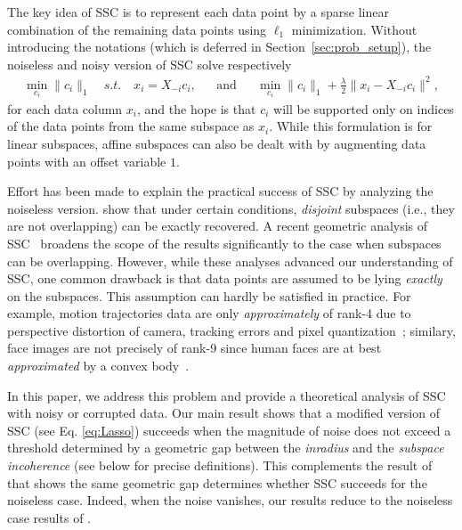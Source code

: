 \documentclass{ctexart}
\begin{document}
The key idea of SSC is to represent each data point by a sparse linear combination of the remaining data points using $\ell_1$ minimization. Without introducing the notations (which is deferred in Section~\ref{sec:prob_setup}), the noiseless and noisy version of SSC solve respectively
\begin{align*}
  \min_{c_i} \|c_i\|_1\quad s.t.\quad x_i=X_{-i}c_i, && \text{and}&& \min_{c_i} \|c_i\|_1+\frac{\lambda}{2}\|x_i-X_{-i}c_i\|^2,
\end{align*}
for each data column $x_i$, and the hope is that $c_i$ will be supported only on indices of the data points from the same subspace as $x_i$. While this formulation is for linear subspaces, affine subspaces can also be dealt with by augmenting data points with an offset variable $1$.

Effort has been made to explain the practical success of SSC by analyzing the noiseless version. \cite{elhamifar2010ssc_icassp} show that under certain conditions, \emph{disjoint} subspaces (i.e., they are not overlapping) can be exactly recovered.
A recent geometric analysis of SSC~\cite{soltanolkotabi2011geometric} broadens the scope of the results significantly to the case when subspaces can be overlapping. However, while these analyses advanced our understanding of SSC, one common drawback
is that data points are assumed to be lying {\em exactly} on the subspaces. This assumption can hardly be satisfied in practice. For example, motion trajectories data are only {\em approximately} of rank-4 due to perspective distortion of camera, tracking errors and pixel quantization~\cite{costeira1998motion_seg}; similary, face images are   not precisely of rank-9 since human faces are at best {\em approximated} by a convex body~\cite{basri2003lambertianface}.

In this paper, we address this problem and provide a theoretical analysis of SSC with noisy or corrupted data. Our main result shows that a modified version of SSC (see Eq. \eqref{eq:Lasso}) succeeds when the magnitude of noise does not exceed a threshold determined by a geometric gap between the \emph{inradius} and the \emph{subspace incoherence} (see below for precise definitions). This complements the result of \cite{soltanolkotabi2011geometric} that shows the same geometric gap determines whether SSC succeeds for the noiseless case. Indeed,  when the noise vanishes, our results reduce to the noiseless case results of \cite{soltanolkotabi2011geometric}.
\end{document}
